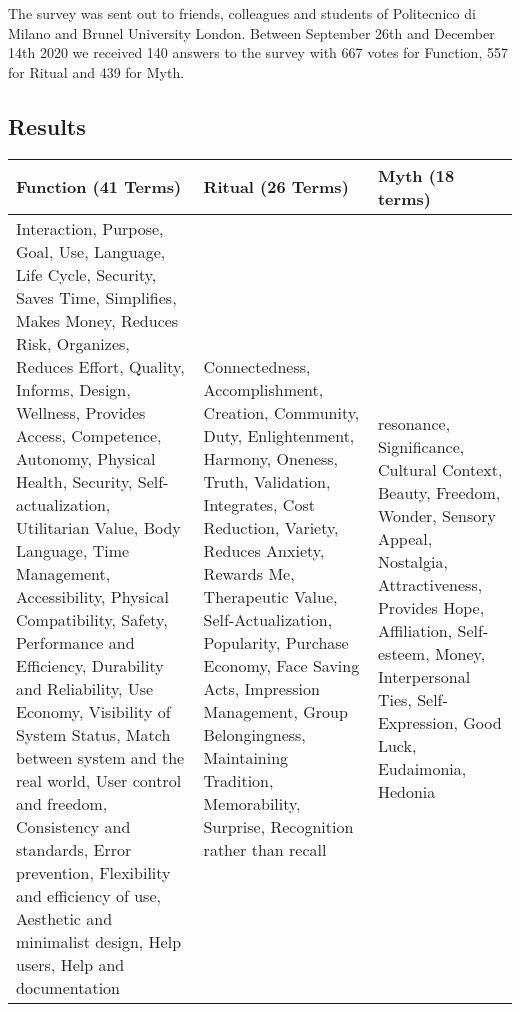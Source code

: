 \documentclass[12pt, usenames, dvipsnames]{report}
\begin{document}
\begin{flushleft}
The survey was sent out to friends, colleagues and students of Politecnico di Milano and Brunel University London.
Between September 26th and December 14th 2020 we received 140 answers to the survey with 667 votes for Function, 557 for Ritual and 439 for Myth.


\subsection{Results}

\vspace{1em}
\begin{table}[h!]
\setlength\extrarowheight{1pt}
\begin{tabular}{@{}>{\raggedright}p{5cm}>{\raggedright}p{5cm}>{\raggedright\arraybackslash}p{5cm}@{}}
\toprule
Function (41 Terms)         & Ritual (26 Terms)      & Myth (18 terms)                                                                                                                                                                                                 \\ \midrule
Interaction, 
Purpose, 
Goal, 
Use, 
Language, 
Life Cycle, 
Security, 
Saves Time, 
Simplifies, 
Makes Money,  
Reduces Risk,  
Organizes, 
Reduces Effort,  
Quality, 
Informs, 
Design, 
Wellness, 
Provides Access,  
Competence, 
Autonomy,
Physical Health, 
Security, 
Self-actualization, 
Utilitarian Value,
Body Language,
Time Management, 
Accessibility,
Physical Compatibility, 
Safety,
Performance and Efficiency,
Durability and Reliability,
Use Economy,
Visibility of System Status,
Match between system and the real world, 
User control and freedom,
Consistency and standards,
Error prevention,
Flexibility and efficiency of use, 
Aesthetic and minimalist design, 
Help users,
Help and documentation

& 

Connectedness,
Accomplishment,
Creation,
Community, 
Duty,
Enlightenment, 
Harmony, 
Oneness,
Truth,
Validation,
Integrates,
Cost Reduction,
Variety,
Reduces Anxiety,
Rewards Me,
Therapeutic Value,
Self-Actualization,
Popularity,
Purchase Economy,
Face Saving Acts,
Impression Management,
Group Belongingness,
Maintaining Tradition,
Memorability,
Surprise,
Recognition rather than recall

& 

resonance,
Significance,
Cultural Context,
Beauty,
Freedom,
Wonder,
Sensory Appeal,
Nostalgia,
Attractiveness,
Provides Hope,
Affiliation,
Self-esteem,
Money,
Interpersonal Ties,
Self-Expression,
Good Luck,
Eudaimonia,
Hedonia


\end{tabular}
\end{table}
\end{flushleft}
\end{document}
